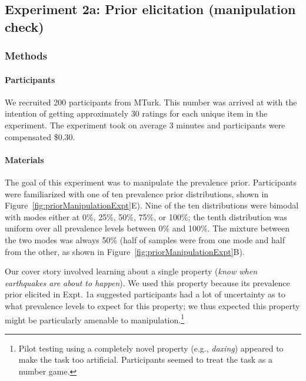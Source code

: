 \documentclass[floatsintext,doc]{apa6}
\let\oldparagraph\paragraph
\renewcommand{\paragraph}[1]{\oldparagraph{#1}\mbox{}}
\let\rmarkdownfootnote\footnote%
\def\footnote{\protect\rmarkdownfootnote}
\begin{document}
\hypertarget{experiment-2a-prior-elicitation-manipulation-check}{%
\subsection{Experiment 2a: Prior elicitation (manipulation check)}\label{experiment-2a-prior-elicitation-manipulation-check}}

\hypertarget{methods-2}{%
\subsubsection{Methods}\label{methods-2}}

\hypertarget{participants-3}{%
\paragraph{Participants}\label{participants-3}}

We recruited 200 participants from MTurk.
This number was arrived at with the intention of getting approximately 30 ratings for each unique item in the experiment.
The experiment took on average 3 minutes and participants were compensated \$0.30.

\hypertarget{materials-1}{%
\paragraph{Materials}\label{materials-1}}

The goal of this experiment was to manipulate the prevalence prior.
Participants were familiarized with one of ten prevalence prior distributions, shown in Figure~\ref{fig:priorManipulationExpt}E).
Nine of the ten distributions were bimodal with modes either at 0\%, 25\%, 50\%, 75\%, or 100\%; the tenth distribution was uniform over all prevalence levels between 0\% and 100\%.
The mixture between the two modes was always 50\% (half of samples were from one mode and half from the other, as shown in Figure~\ref{fig:priorManipulationExpt}B).

Our cover story involved learning about a single property (\emph{know when earthquakes are about to happen}).
We used this property because its prevalence prior elicited in Expt. 1a suggested participants had a lot of uncertainty as to what prevalence levels to expect for this property; we thus expected this property might be particularly amenable to manipulation.\footnote{Pilot testing using a completely novel property (e.g., \emph{daxing}) appeared to make the task too artificial. Participants seemed to treat the task as a number game. }
\end{document}

